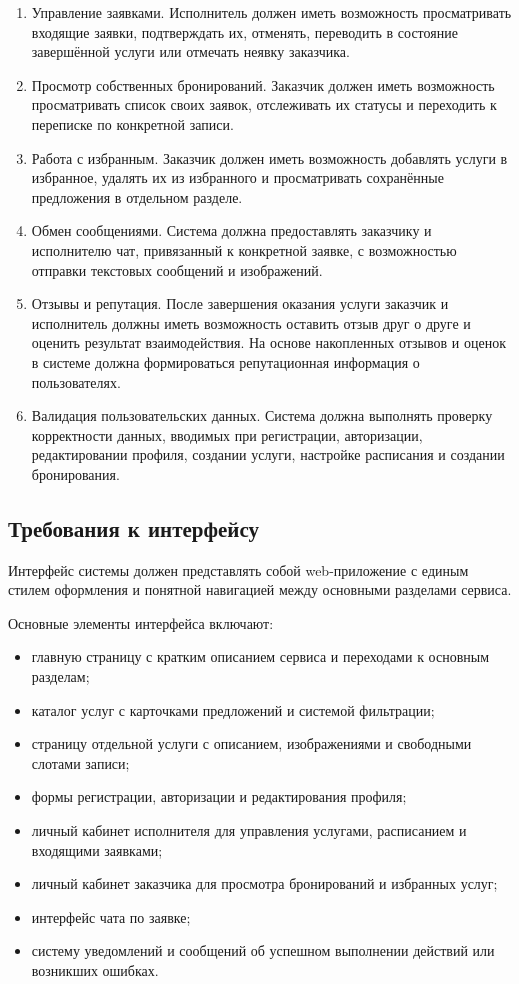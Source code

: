 \begin{enumerate}
	\item Управление заявками.  
	Исполнитель должен иметь возможность просматривать входящие заявки, подтверждать их, отменять, переводить в состояние завершённой услуги или отмечать неявку заказчика.
	
	\item Просмотр собственных бронирований.  
	Заказчик должен иметь возможность просматривать список своих заявок, отслеживать их статусы и переходить к переписке по конкретной записи.
	
	\item Работа с избранным.  
	Заказчик должен иметь возможность добавлять услуги в избранное, удалять их из избранного и просматривать сохранённые предложения в отдельном разделе.
	
	\item Обмен сообщениями.  
	Система должна предоставлять заказчику и исполнителю чат, привязанный к конкретной заявке, с возможностью отправки текстовых сообщений и изображений.
	
	\item Отзывы и репутация.  
	После завершения оказания услуги заказчик и исполнитель должны иметь возможность оставить отзыв друг о друге и оценить результат взаимодействия. На основе накопленных отзывов и оценок в системе должна формироваться репутационная информация о пользователях.
	
	\item Валидация пользовательских данных.  
	Система должна выполнять проверку корректности данных, вводимых при регистрации, авторизации, редактировании профиля, создании услуги, настройке расписания и создании бронирования.
\end{enumerate}

\subsection{Требования к интерфейсу}

Интерфейс системы должен представлять собой web-приложение с единым стилем оформления и понятной навигацией между основными разделами сервиса.

Основные элементы интерфейса включают:
\begin{itemize}
	\item главную страницу с кратким описанием сервиса и переходами к основным разделам;
	\item каталог услуг с карточками предложений и системой фильтрации;
	\item страницу отдельной услуги с описанием, изображениями и свободными слотами записи;
	\item формы регистрации, авторизации и редактирования профиля;
	\item личный кабинет исполнителя для управления услугами, расписанием и входящими заявками;
	\item личный кабинет заказчика для просмотра бронирований и избранных услуг;
	\item интерфейс чата по заявке;
	\item систему уведомлений и сообщений об успешном выполнении действий или возникших ошибках.
\end{itemize}

